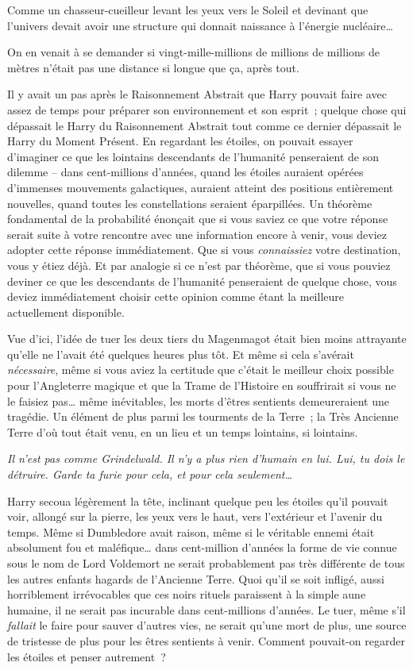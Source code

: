 Comme un chasseur-cueilleur levant les yeux vers le Soleil et devinant que l'univers devait avoir une structure qui donnait naissance à l'énergie nucléaire…

On en venait à se demander si vingt-mille-millions de millions de millions de mètres n'était pas une distance si longue que ça, après tout.

Il y avait un pas après le Raisonnement Abstrait que Harry pouvait faire avec assez de temps pour préparer son environnement et son esprit~; quelque chose qui dépassait le Harry du Raisonnement Abstrait tout comme ce dernier dépassait le Harry du Moment Présent.
En regardant les étoiles, on pouvait essayer d'imaginer ce que les lointains descendants de l'humanité penseraient de son dilemme -- dans cent-millions d'années, quand les étoiles auraient opérées d'immenses mouvements galactiques, auraient atteint des positions entièrement nouvelles, quand toutes les constellations seraient éparpillées.
Un théorème fondamental de la probabilité énonçait que si vous saviez ce que votre réponse serait suite à votre rencontre avec une information encore à venir, vous deviez adopter cette réponse immédiatement.
Que si vous \emph{connaissiez} votre destination, vous y étiez déjà.
Et par analogie si ce n'est par théorème, que si vous pouviez deviner ce que les descendants de l'humanité penseraient de quelque chose, vous deviez immédiatement choisir cette opinion comme étant la meilleure actuellement disponible.

Vue d'ici, l'idée de tuer les deux tiers du Magenmagot était bien moins attrayante qu'elle ne l'avait été quelques heures plus tôt.
Et même si cela s'avérait \emph{nécessaire}, même si vous aviez la certitude que c'était le meilleur choix possible pour l'Angleterre magique et que la Trame de l'Histoire en souffrirait si vous ne le faisiez pas… même inévitables, les morts d'êtres sentients demeureraient une tragédie.
Un élément de plus parmi les tourments de la Terre~; la Très Ancienne Terre d'où tout était venu, en un lieu et un temps lointains, si lointains.

\emph{Il n'est pas comme Grindelwald.
Il n'y a plus rien d'humain en lui.
Lui, tu dois le détruire.
Garde ta furie pour cela, et pour cela seulement…}

Harry secoua légèrement la tête, inclinant quelque peu les étoiles qu'il pouvait voir, allongé sur la pierre, les yeux vers le haut, vers l'extérieur et l'avenir du temps.
Même si Dumbledore avait raison, même si le véritable ennemi était absolument fou et maléfique… dans cent-million d'années la forme de vie connue sous le nom de Lord Voldemort ne serait probablement pas très différente de tous les autres enfants hagards de l'Ancienne Terre.
Quoi qu'il se soit infligé, aussi horriblement irrévocables que ces noirs rituels paraissent à la simple aune humaine, il ne serait pas incurable dans cent-millions d'années.
Le tuer, même s'il \emph{fallait} le faire pour sauver d'autres vies, ne serait qu'une mort de plus, une source de tristesse de plus pour les êtres sentients à venir.
Comment pouvait-on regarder les étoiles et penser autrement~?

